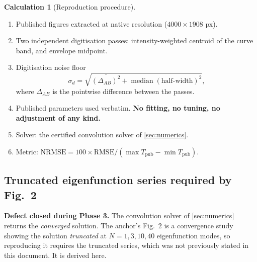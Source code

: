 \documentclass[11pt,a4paper]{article}
\theoremstyle{definition}
\newtheorem{calculationx}{Calculation}[section]
\begin{document}
\begin{calculationx}[Reproduction procedure]
\label{calc:repro}
\begin{enumerate}[nosep,label=(\arabic*)]
  \item Published figures extracted at native resolution
        ($4000\times1908$ px).
  \item Two independent digitisation passes: intensity-weighted centroid of the
        curve band, and envelope midpoint.
  \item Digitisation noise floor
        \begin{equation}
          \sigma_{d} = \sqrt{\overline{\left(\Delta_{AB}\right)^{2}}
                       + \operatorname{median}(\text{half-width})^{2}} ,
          \label{eq:sigmad}
        \end{equation}
        where $\Delta_{AB}$ is the pointwise difference between the passes.
  \item Published parameters used verbatim. \textbf{No fitting, no tuning, no
        adjustment of any kind.}
  \item Solver: the certified convolution solver of \cref{sec:numerics}.
  \item Metric: $\mathrm{NRMSE} = 100\times\mathrm{RMSE}/
        (\max T_{\text{pub}} - \min T_{\text{pub}})$.
\end{enumerate}
\end{calculationx}

\subsection{Truncated eigenfunction series required by Fig.~2}
\label{sec:series}

\textbf{Defect closed during Phase 3.} The convolution solver of
\cref{sec:numerics} returns the \emph{converged} solution. The anchor's Fig.~2
is a convergence study showing the solution \emph{truncated} at
$N=1,3,10,40$ eigenfunction modes, so reproducing it requires the truncated
series, which was not previously stated in this document. It is derived here.
\end{document}
